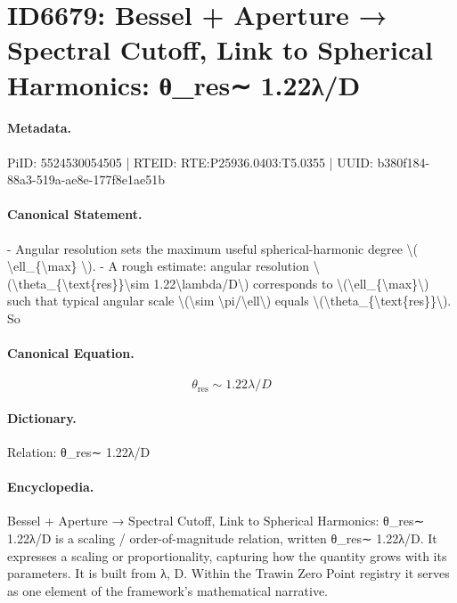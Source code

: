 \section*{ID6679: Bessel + Aperture → Spectral Cutoff, Link to Spherical Harmonics: θ\_res∼ 1.22λ/D}
\paragraph{Metadata.}
PiID: 5524530054505 | RTEID: RTE:P25936.0403:T5.0355 | UUID: b380f184-88a3-519a-ae8e-177f8e1ae51b

\paragraph{Canonical Statement.}
- Angular resolution sets the maximum useful spherical-harmonic degree \textbackslash{}( \textbackslash{}ell\_\{\textbackslash{}max\} \textbackslash{}). - A rough estimate: angular resolution \textbackslash{}(\textbackslash{}theta\_\{\textbackslash{}text\{res\}\}\textbackslash{}sim 1.22\textbackslash{}lambda/D\textbackslash{}) corresponds to \textbackslash{}(\textbackslash{}ell\_\{\textbackslash{}max\}\textbackslash{}) such that typical angular scale \textbackslash{}(\textbackslash{}sim \textbackslash{}pi/\textbackslash{}ell\textbackslash{}) equals \textbackslash{}(\textbackslash{}theta\_\{\textbackslash{}text\{res\}\}\textbackslash{}). So

\paragraph{Canonical Equation.}
\[
\theta_{\text{res}}\sim 1.22\lambda/D
\]

\paragraph{Dictionary.}
Relation: θ\_res∼ 1.22λ/D

\paragraph{Encyclopedia.}
Bessel + Aperture → Spectral Cutoff, Link to Spherical Harmonics: θ\_res∼ 1.22λ/D is a scaling / order-of-magnitude relation, written θ\_res∼ 1.22λ/D. It expresses a scaling or proportionality, capturing how the quantity grows with its parameters. It is built from λ, D. Within the Trawin Zero Point registry it serves as one element of the framework's mathematical narrative.
